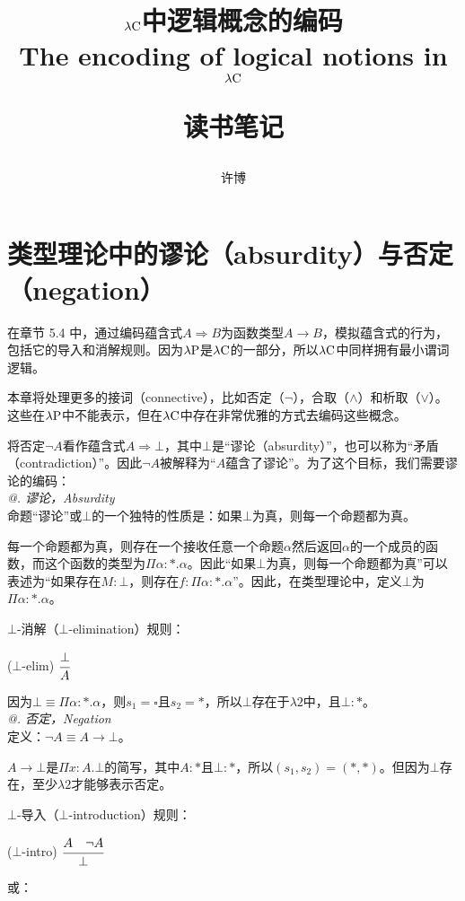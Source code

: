 \documentclass[UTF8]{article}
\title{$\lambda{\rm C}$中逻辑概念的编码\\The encoding of logical notions in $\lambda{\rm C}$\\[2ex]\begin{large}读书笔记\end{large}}
\author{许博}
\date{}
\makeatletter
\newcommand{\Rmnum}[1]{\expandafter\@slowromancap\romannumeral #1@}
\makeatother
\begin{document}
\maketitle
	\section{类型理论中的谬论（absurdity）与否定（negation）}
	\noindent
	在章节 5.4 中，通过编码蕴含式$A\Rightarrow B$为函数类型$A\rightarrow B$，模拟蕴含式的行为，包括它的导入和消解规则。因为$\lambda{\rm P}$是$\lambda{\rm C}$的一部分，所以$\lambda{\rm C}$中同样拥有最小谓词逻辑。
	
		本章将处理更多的接词（connective），比如否定（$\neg$），合取（$\land$）和析取（$\lor$）。这些在$\lambda{\rm P}$中不能表示，但在$\lambda{\rm C}$中存在非常优雅的方式去编码这些概念。
		
		将否定$\neg A$看作蕴含式$A\Rightarrow \bot$，其中$\bot$是“谬论（absurdity）”，也可以称为“矛盾（contradiction）”。因此$\neg A$被解释为“$A$蕴含了谬论”。为了这个目标，我们需要谬论的编码：\\
		
	\noindent
	\textit{\Rmnum{1}. 谬论，Absurdity}\\
	命题“谬论”或$\bot$的一个独特的性质是：如果$\bot$为真，则每一个命题都为真。
	
		每一个命题都为真，则存在一个接收任意一个命题$\alpha$然后返回$\alpha$的一个成员的函数，而这个函数的类型为$\Pi\alpha:*.\alpha$。因此“如果$\bot$为真，则每一个命题都为真”可以表述为“如果存在$M:\bot$，则存在$f:\Pi\alpha:*.\alpha$”。因此，在类型理论中，定义$\bot$为$\Pi\alpha:*.\alpha$。
		
		$\bot$-消解（$\bot$-elimination）规则：
		
		($\bot$-elim) $\cfrac{\bot}{A}$
		
		因为$\bot\equiv\Pi\alpha:*.\alpha$，则$s_1=\square$且$s_2=*$，所以$\bot$存在于$\lambda{2}$中，且$\bot:*$。\\
		
	\noindent
	\textit{\Rmnum{2}. 否定，Negation}\\
	定义：$\neg A\equiv A\rightarrow\bot$。
	
		$A\rightarrow\bot$是$\Pi x:A.\bot$的简写，其中$A:*$且$\bot:*$，所以$(s_1,s_2)=(*,*)$。但因为$\bot$存在，至少$\lambda{2}$才能够表示否定。
		
		$\bot$-导入（$\bot$-introduction）规则：
		
		($\bot$-intro) $\cfrac{A\ \ \ \neg A}{\bot}$
		
		或：
		
\end{document}
